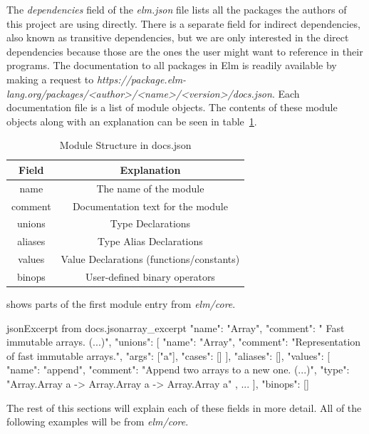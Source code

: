 \documentclass[../thesis.tex]{subfiles}
\begin{document}
The \textit{dependencies} field of the \textit{elm.json} file lists all the packages the authors of this project
are using directly.
There is a separate field for indirect dependencies, also known as transitive dependencies, 
but we are only interested in the direct dependencies because those are the ones the user might want to
reference in their programs.
The documentation to all packages in Elm is readily available by making a request to
\textit{https://package.elm-lang.org/packages/<author>/<name>/<version>/docs.json}.
Each documentation file is a list of module objects.
The contents of these module objects along with an explanation can be seen in table~\ref{tab:documentation_fields}.

\begin{table}[htpb]
    \centering
    \begin{tabular}{|c|c|}
        \hline
        Field & Explanation \\
        \hline
        name & The name of the module \\
        comment & Documentation text for the module \\
        unions & Type Declarations \\
        aliases & Type Alias Declarations \\
        values & Value Declarations (functions/constants) \\
        binops & User-defined binary operators \\
        \hline
    \end{tabular}
    \caption{Module Structure in docs.json}
    \label{tab:documentation_fields}
\end{table}


 shows parts of the first module entry from \textit{elm/core}.
\begin{code}{json}{Excerpt from docs.json}{array_excerpt}
  {
    "name": "Array",
    "comment": " Fast immutable arrays. (...)",
    "unions": [
      {
        "name": "Array",
        "comment": "Representation of fast immutable arrays.",
        "args": ["a"],
        "cases": []
      }
    ],
    "aliases": [],
    "values": [
      {
        "name": "append",
        "comment": "Append two arrays to a new one. (...)",
        "type": 
            "Array.Array a -> Array.Array a -> Array.Array a"
      },
      ...
    ],
    "binops": []
  }
\end{code}
The rest of this sections will explain each of these fields in more detail.
All of the following examples will be from \textit{elm/core}.
\end{document}
